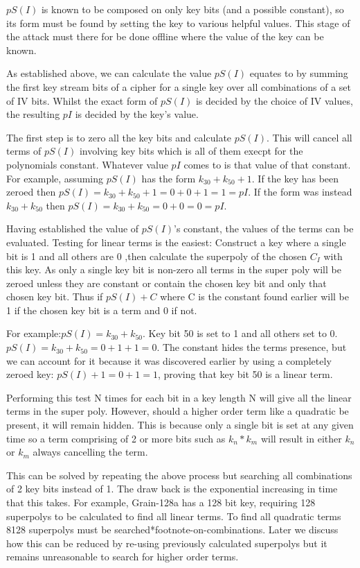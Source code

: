 \documentclass{report}
\begin{document}
$pS(I)$ is known to be composed on only key bits (and a possible constant), so its form must be found by setting the key to various helpful values. This stage of the attack must there for be done offline where the value of the key can be known.

As established above, we can calculate the value $pS(I)$ equates to by summing the first key stream bits of a cipher for a single key over all combinations of a set of IV bits. Whilst the exact form of $pS(I)$ is decided by the choice of IV values, the resulting $pI$ is decided by the key's value.

The first step is to zero all the key bits and calculate $pS(I)$. This will cancel all terms of $pS(I)$ involving key bits which is all of them execpt for the polynomials constant. Whatever value $pI$ comes to is that value of that constant. For example, assuming $pS(I)$ has the form $k_{30}+k_{50}+1$. If the key has been zeroed then $pS(I)=k_{30}+k_{50}+1=0+0+1=1=pI$. If the form was instead $k_{30}+k_{50}$ then $pS(I)=k_{30}+k_{50}=0+0=0=pI$.

Having established the value of $pS(I)$'s constant, the values of the terms can be evaluated. Testing for linear terms is the easiest: Construct a key where a single bit is 1 and all others are 0 ,then calculate the superpoly of the chosen $C_I$ with this key. As only a single key bit is non-zero all terms in the super poly will be zeroed unless they are constant or contain the chosen key bit and only that chosen key bit. Thus if $pS(I)+C$ where C is the constant found earlier will be 1 if the chosen key bit is a term and 0 if not.

For example:$pS(I)=k_{30}+k_{50}$. Key bit 50 is set to 1 and all others set to 0. $pS(I)=k_{30}+k_{50}=0+1+1=0$. The constant hides the terms presence, but we can account for it because it was discovered earlier by using a completely zeroed key: $pS(I)+1=0+1=1$, proving that key bit 50 is a linear term.

Performing this test N times for each bit in a key length N will give all the linear terms in the super poly. However, should a higher order term like a quadratic be present, it will remain hidden. This is because only a single bit is set at any given time so a term comprising of 2 or more bits such as $k_n*k_m$ will result in either $k_n$ or $k_m$ always cancelling the term.

This can be solved by repeating the above process but searching all combinations of 2 key bits instead of 1. The draw back is the exponential increasing in time that this takes. For example, Grain-128a has a 128 bit key, requiring 128 superpolys to be calculated to find all linear terms. To find all quadratic terms 8128 superpolys must be searched*footnote-on-combinations. Later we discuss how this can be reduced by re-using previously calculated superpolys but it remains unreasonable to search for higher order terms.
\end{document}
